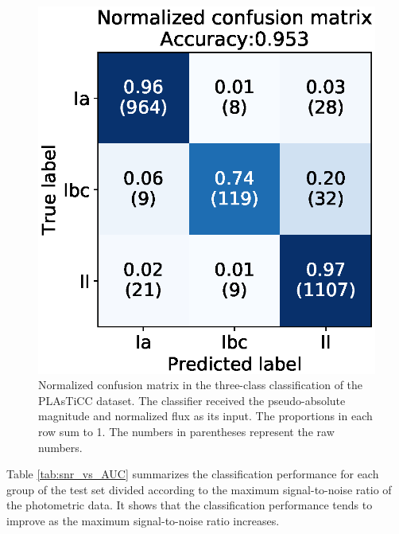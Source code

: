 \documentclass[useamsfonts]{pasj01}
\begin{document}
%
\begin{figure}[htbp]
  \begin{center}
     \includegraphics[width=\columnwidth]{figures/06_CM_abs-mag_scaled-flux_w-mixup_predictions_test_2.eps}
  \end{center}
  \caption{%
  Normalized confusion matrix in the three-class classification of the PLAsTiCC dataset. The classifier received the pseudo-absolute magnitude and normalized flux as its input. The proportions in each row sum to 1. The numbers in parentheses represent the raw numbers.
  }%
  \label{fig:plasticc_3class_CM}
\end{figure}
%
%
Table \ref{tab:snr_vs_AUC} summarizes the classification performance for each group of the test set divided according to the maximum signal-to-noise ratio of the photometric data.
It shows that the classification performance tends to improve as the maximum signal-to-noise ratio increases.
\end{document}
